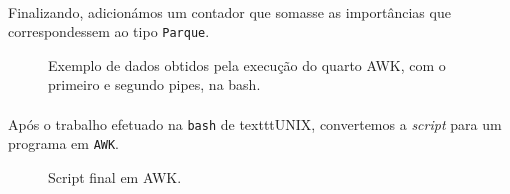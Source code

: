 \documentclass[11pt,a4paper]{report}
\begin{document}
\paragraph*{}Finalizando, adicionámos um contador que somasse as importâncias que correspondessem ao tipo \texttt{Parque}. 

\begin{figure}[H]
\centering
\noindent{}
\caption{Exemplo de dados obtidos pela execução do quarto AWK, com o primeiro e segundo pipes, na bash.}
\end{figure}

\paragraph*{}Após o trabalho efetuado na \texttt{bash} de texttt{UNIX}, convertemos a \textit{script} para um programa em \texttt{AWK}.

\begin{figure}[H]
\centering
\noindent{}
\caption{Script final em AWK.}
\end{figure}
\end{document}
